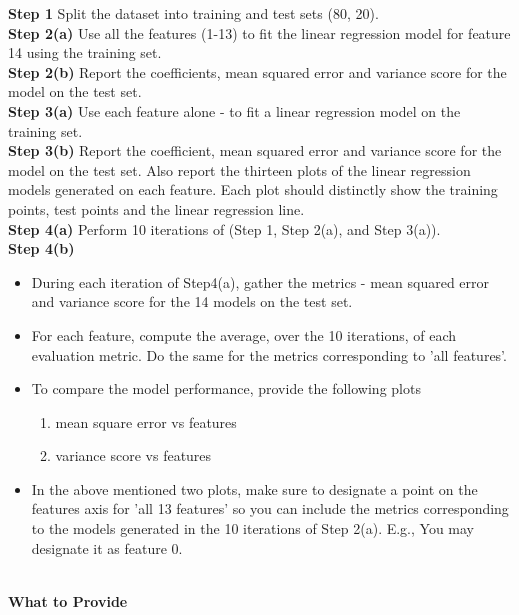 \documentclass[letter-paper,12pt]{article} %
\begin{document}
\textbf{Step 1} Split the dataset into training and test sets (80, 20). \\
\textbf{Step 2(a)}  Use all the features (1-13) to fit the linear regression model for feature 14 using the training set.\\ 
\textbf{Step 2(b)} Report the coefficients, mean squared error and variance score for the model on the test set. \\
\textbf{Step 3(a)} Use each feature alone - to fit a linear regression model on the training set.\\
\textbf{Step 3(b)} Report the coefficient, mean squared error and variance score for the model on the test set. Also report the thirteen plots of the linear regression models generated on each feature. Each plot should distinctly show the training points, test points and the linear regression line.\\
\textbf{Step 4(a)} Perform 10 iterations of (Step 1, Step 2(a), and Step 3(a)).\\
\textbf{Step 4(b)} 
\begin{itemize}
    \item During each iteration of Step4(a), gather the metrics - mean squared error and variance score for the 14 models on the test set.
    \item For each feature, compute the average, over the 10 iterations,  of each evaluation metric.  Do the same for the metrics corresponding to 'all features'. 
    \item To compare the model performance, provide the following plots 
		\begin{enumerate}   
         	\item{mean square error vs features}
         	\item{variance score vs features}
         \end{enumerate}
    \item  In the above mentioned two plots, make sure to designate a point on the features axis for 'all 13 features' so you can include the metrics corresponding to the models generated in the 10 iterations of Step 2(a). E.g.,  You may designate it as feature 0.  \\ 
\end{itemize}\\


\textbf{What to Provide}\\
\end{document}
